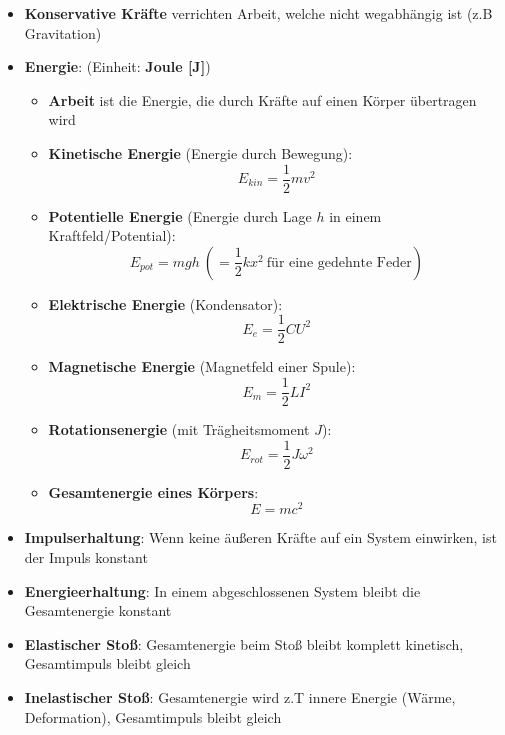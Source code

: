 \begin{itemize}
	\item \textbf{Konservative Kräfte} verrichten Arbeit, welche nicht wegabhängig ist (z.B Gravitation)
	\newpage
	\item \textbf{Energie}: (Einheit: \textbf{Joule [J]})
	\begin{itemize}
		\item \textbf{Arbeit} ist die Energie, die durch Kräfte auf einen Körper übertragen wird
		\item \textbf{Kinetische Energie} (Energie durch Bewegung):
		\begin{equation}
			E_{kin} = \frac{1}{2}mv^2
		\end{equation}
		\item \textbf{Potentielle Energie} (Energie durch Lage $h$ in einem Kraftfeld/Potential):
		\begin{equation}
			E_{pot} = mgh\ (= \frac{1}{2}kx^2\ \text{für eine gedehnte Feder})
		\end{equation}
		\item \textbf{Elektrische Energie} (Kondensator):
		\begin{equation}
			E_e = \frac{1}{2}CU^2
		\end{equation}
		\item \textbf{Magnetische Energie} (Magnetfeld einer Spule):
		\begin{equation}
			E_m = \frac{1}{2}LI^2
		\end{equation}
		\item \textbf{Rotationsenergie} (mit Trägheitsmoment $J$):
		\begin{equation}
			E_{rot} = \frac{1}{2}J\omega^2
		\end{equation}
		\item \textbf{Gesamtenergie eines Körpers}:
		\begin{equation}
			E = mc^2
		\end{equation}
	\end{itemize}
	\item \textbf{Impulserhaltung}: Wenn keine äußeren Kräfte auf ein System einwirken, ist der Impuls konstant
	\item \textbf{Energieerhaltung}: In einem abgeschlossenen System bleibt die Gesamtenergie konstant
	\item \textbf{Elastischer Stoß}: Gesamtenergie beim Stoß bleibt komplett kinetisch, Gesamtimpuls bleibt gleich
	\item \textbf{Inelastischer Stoß}: Gesamtenergie wird z.T innere Energie (Wärme, Deformation), Gesamtimpuls bleibt gleich

\end{itemize}
